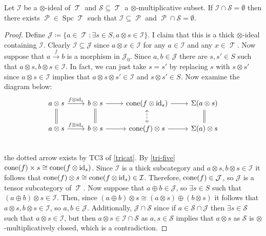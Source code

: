 \documentclass[11pt]{article}
\DeclareMathOperator{\TT}{\mathcal{T}}
\DeclareMathOperator{\cP}{\mathcal{P}}
\DeclareMathOperator{\spc}{Spc}
\begin{document}
\begin{lem}
Let $\mathcal{I}$ be a $\otimes$-ideal of $\TT$ and $\mathcal{S} \subseteq \TT$ a $\otimes$-multiplicative subset. If $\mathcal{I} \cap \mathcal{S} = \emptyset$ then there exists $\cP \in \spc \TT$ such that $\mathcal{I} \subseteq \cP$ and $\cP \cap \mathcal{S} = \emptyset$.
\end{lem}
\begin{proof}
Define $\mathcal{J} \coloneqq \{a \in \TT: \exists s \in S, a \otimes s \in \mathcal{I}\}$. I claim that this is a thick $\otimes$-ideal containing $\mathcal{I}$. Clearly $\mathcal{I} \subseteq \mathcal{J}$ since $a \otimes x \in \mathcal{I}$ for any $a \in \mathcal{I}$ and any $x \in \TT$. Now suppose that $a \xrightarrow{f} b$ is a morphism in $\mathcal{J}_0$. Since $a,b \in \mathcal{J}$ there are $s,s' \in S$ such that $a \otimes s, b \otimes s \in \mathcal{I}$. In fact, we can just take $s = s'$ by replacing $s$ with $s \otimes s'$ since $a \otimes s \in \mathcal{I}$ implies that $a \otimes s \otimes s' \in \mathcal{I}$ and $s \otimes s' \in S$. Now examine the diagram below:
\[\begin{tikzcd}
a \otimes s \ar[r,"f \otimes \id_s"] \ar[d,equal] & b \otimes s \ar[d,equal] \ar[r] & \cone(f \otimes \id_s) \ar[r] \ar[d,dashed,leftrightarrow] & \Sigma(a \otimes s) \ar[d, equal]\\
 a \otimes s \ar[r,"f \otimes \id_s"]& b \otimes s \ar[r] & \cone(f) \otimes s \ar[r] &  \Sigma(a) \otimes s \\
\end{tikzcd}\]
the dotted arrow exists by TC3 of \autoref{tricat}. By \autoref{tri-five} $\operatorname{cone}(f) \times s \cong \operatorname{cone}(f \otimes \operatorname{id}_s)$. Since $\mathcal{I}$ is a thick subcategory and $a \otimes s, b \otimes s \in \mathcal{I}$ it follows that $\operatorname{cone}(f) \otimes s \cong \operatorname{cone}(f \otimes \operatorname{id}_s) \in \mathcal{I}$. Therefore, $\operatorname{cone}(f) \in \mathcal{J}$, so $\mathcal{J}$ is a tensor subcategory of $\TT$. Now suppose that $a \oplus b \in \mathcal{J} $, so $\exists s \in S $ such that $(a \oplus b) \otimes s \in \mathcal{I}$. Then, since $(a \oplus b) \otimes s \cong (a \otimes s) \oplus (b \otimes s)$ it follows that $a \otimes s, b \otimes s \in \mathcal{I}$, so $a,b \in \mathcal{J}$. Additionally, $\mathcal{J} \cap \mathcal{S}$ since if $a \in \mathcal{S} \cap \mathcal{J}$ then $\exists s \in \mathcal{S}$ such that $a \otimes s \in \mathcal{I}$, but then $a \otimes s \in \mathcal{I} \cap \mathcal{S}$ as $a,s \in \mathcal{S}$ implies that $a \otimes s$ as $\mathcal{S}$ is $\otimes$-multiplicatively closed, which is a contradiction.


\end{proof}
\end{document}
